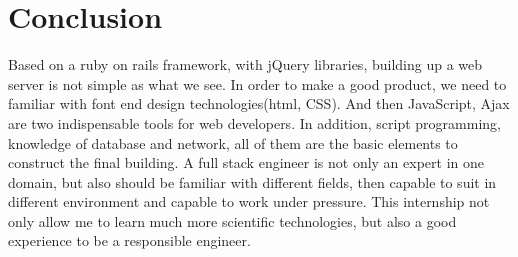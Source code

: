 \section{Conclusion}
Based on a ruby on rails framework, with jQuery libraries, building up a web server is not simple as what we see. In order to make a good product, we need to familiar with font end design technologies(html, CSS). And then JavaScript, Ajax are two indispensable tools for web developers. In addition, script programming, knowledge of database and network, all of them are the basic elements to construct the final building. A full stack engineer is not only an expert in one domain, but also should be familiar with different fields, then capable to suit in different environment and capable to work under pressure. This internship not only allow me to learn much more scientific technologies, but also a good experience to be a responsible engineer.